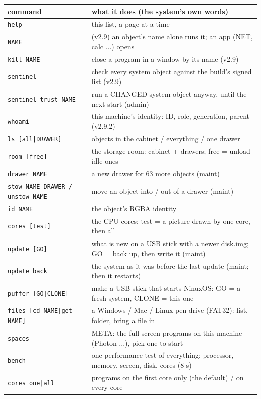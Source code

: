 \begin{longtable}{@{}p{5.2cm} p{9.8cm}@{}}
\toprule
command & what it does (the system's own words) \\ \midrule
\endhead
\texttt{help} & this list, a page at a time \\
\texttt{NAME} & (v2.9) an object's name alone runs it; an app (NET, calc ...) opens \\
\texttt{kill NAME} & close a program in a window by its name (v2.9) \\
\texttt{sentinel} & check every system object against the build's signed list (v2.9) \\
\texttt{sentinel trust NAME} & run a CHANGED system object anyway, until the next start (admin) \\
\texttt{whoami} & this machine's identity: ID, role, generation, parent (v2.9.2) \\
\texttt{ls [all|DRAWER]} & objects in the cabinet / everything / one drawer \\
\texttt{room [free]} & the storage room: cabinet + drawers; free = unload idle ones \\
\texttt{drawer NAME} & a new drawer for 63 more objects (maint) \\
\texttt{stow NAME DRAWER / unstow NAME} & move an object into / out of a drawer (maint) \\
\texttt{id NAME} & the object's RGBA identity \\
\texttt{cores [test]} & the CPU cores; test = a picture drawn by one core, then all \\
\texttt{update [GO]} & what is new on a USB stick with a newer disk.img; GO = back up, then write it (maint) \\
\texttt{update back} & the system as it was before the last update (maint; then it restarts) \\
\texttt{puffer [GO|CLONE]} & make a USB stick that starts NinuxOS: GO = a fresh system, CLONE = this one \\
\texttt{files [cd NAME|get NAME]} & a Windows / Mac / Linux pen drive (FAT32): list, folder, bring a file in \\
\texttt{spaces} & META: the full-screen programs on this machine (Photon ...), pick one to start \\
\texttt{bench} & one performance test of everything: processor, memory, screen, disk, cores (8 s) \\
\texttt{cores one|all} & programs on the first core only (the default) / on every core \\

\end{longtable}
